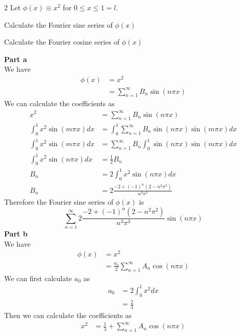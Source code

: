 \documentclass[answers,12pt,addpoints]{exam}
\begin{document}
\begin{questions}
     2
    Let $\phi(x) \equiv x^2$ for $0 \leq x \leq 1 = l$. 
    \begin{parts}
        \item Calculate the Fourier sine series of $\phi(x)$
        \item Calculate the Fourier cosine series of $\phi(x)$
    \end{parts}
    \begin{solution}
        \textbf{Part a} \\
        We have
        \begin{align*}
            \phi(x) &= x^2 \\
            &= \sum_{n=1}^{\infty} B_n \sin(n\pi x)
        \end{align*}
        We can calculate the coefficients as
        \begin{align*}
            x^2 &= \sum_{n=1}^{\infty} B_n \sin(n\pi x) \\
            \int_{0}^{1} x^2 \sin(m \pi x) dx &= \int_{0}^{1} \sum_{n=1}^{\infty} B_n \sin(n\pi x) \sin(m\pi x) dx \\
            \int_{0}^{1} x^2 \sin(m \pi x) dx &= \sum_{n=1}^{\infty} B_n \int_{0}^{1} \sin(n\pi x) \sin(m\pi x) dx \\
            \int_{0}^{1} x^2 \sin(n \pi x) dx &= \frac{1}{2} B_n \\
            B_n &= 2 \int_{0}^{1} x^2 \sin(n\pi x) dx\\
            B_n &= 2 \frac{-2 + (-1)^n(2-n^2\pi^2)}{n^3\pi^3}
        \end{align*}
        Therefore the Fourier sine series of $\phi(x)$ is
        \[ \sum_{n=1}^{\infty} 2 \frac{-2 + (-1)^n(2-n^2\pi^2)}{n^3\pi^3} \sin(n\pi x) \]
        \textbf{Part b} \\
        We have
        \begin{align*}
            \phi(x) &= x^2 \\
            &= \frac{a_0}{2} \sum_{n=1}^{\infty} A_n \cos(n\pi x)
        \end{align*}
        We can first calculate $a_0$ as
        \begin{align*}
            a_0 &= 2 \int_{0}^{1} x^2 dx \\
            &= \frac{2}{3}
        \end{align*}
        Then we can calculate the coefficients as
        \begin{align*}
            x^2 &= \frac{1}{3} + \sum_{n=1}^{\infty} A_n \cos(n\pi x) \\

\end{align*}
\end{solution}
\end{questions}
\end{document}
